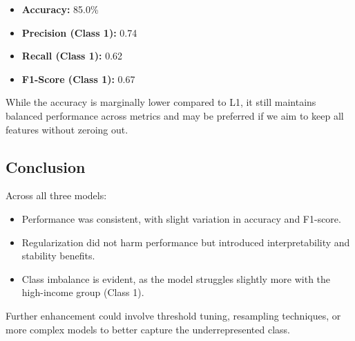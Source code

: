 \documentclass[a4paper,12pt]{article}
\begin{document}
\begin{itemize}
    \item \textbf{Accuracy:} 85.0\%
    \item \textbf{Precision (Class 1):} 0.74
    \item \textbf{Recall (Class 1):} 0.62
    \item \textbf{F1-Score (Class 1):} 0.67
\end{itemize}

While the accuracy is marginally lower compared to L1, it still maintains balanced performance across metrics and may be preferred if we aim to keep all features without zeroing out.

\subsection{Conclusion}

Across all three models:

\begin{itemize}
    \item Performance was consistent, with slight variation in accuracy and F1-score.
    \item Regularization did not harm performance but introduced interpretability and stability benefits.
    \item Class imbalance is evident, as the model struggles slightly more with the high-income group (Class 1).
\end{itemize}

Further enhancement could involve threshold tuning, resampling techniques, or more complex models to better capture the underrepresented class.
\end{document}
